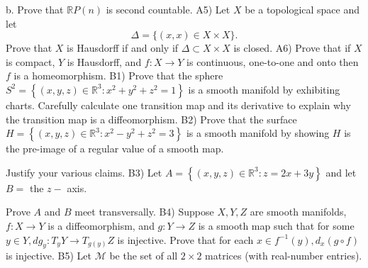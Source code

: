 \documentclass[10pt]{article}
\begin{document}
b. Prove that $\mathbb{R} P(n)$ is second countable.
\newpage
A5) Let $X$ be a topological space and let
$$
\Delta=\{(x, x) \in X \times X\} .
$$
Prove that $X$ is Hausdorff if and only if $\Delta \subset X \times X$ is closed.
\newpage
A6) Prove that if $X$ is compact, $Y$ is Hausdorff, and $f: X \rightarrow Y$ is continuous, one-to-one and onto then $f$ is a homeomorphism.
\newpage
B1) Prove that the sphere $S^{2}=\left\{(x, y, z) \in \mathbb{R}^{3}: x^{2}+y^{2}+z^{2}=1\right\}$ is a smooth manifold by exhibiting charts. Carefully calculate one transition map and its derivative to explain why the transition map is a diffeomorphism.
\newpage
B2) Prove that the surface $H=\left\{(x, y, z) \in \mathbb{R}^{3}: x^{2}-y^{2}+z^{2}=3\right\}$ is a smooth manifold by showing $H$ is the pre-image of a regular value of a smooth map.

Justify your various claims.
\newpage
B3) Let $A=\left\{(x, y, z) \in \mathbb{R}^{3}: z=2 x+3 y\right\}$ and let $B=$ the $z-$ axis.

Prove $A$ and $B$ meet transversally.
\newpage
B4) Suppose $X, Y, Z$ are smooth manifolds, $f: X \rightarrow Y$ is a diffeomorphism, and $g: Y \rightarrow Z$ is a smooth map such that for some $y \in Y, d g_{y}: T_{y} Y \rightarrow T_{g(y)} Z$ is injective. Prove that for each $x \in f^{-1}(y), d_{x}(g \circ f)$ is injective.
\newpage
B5) Let $\mathcal{M}$ be the set of all $2 \times 2$ matrices (with real-number entries).
\end{document}
